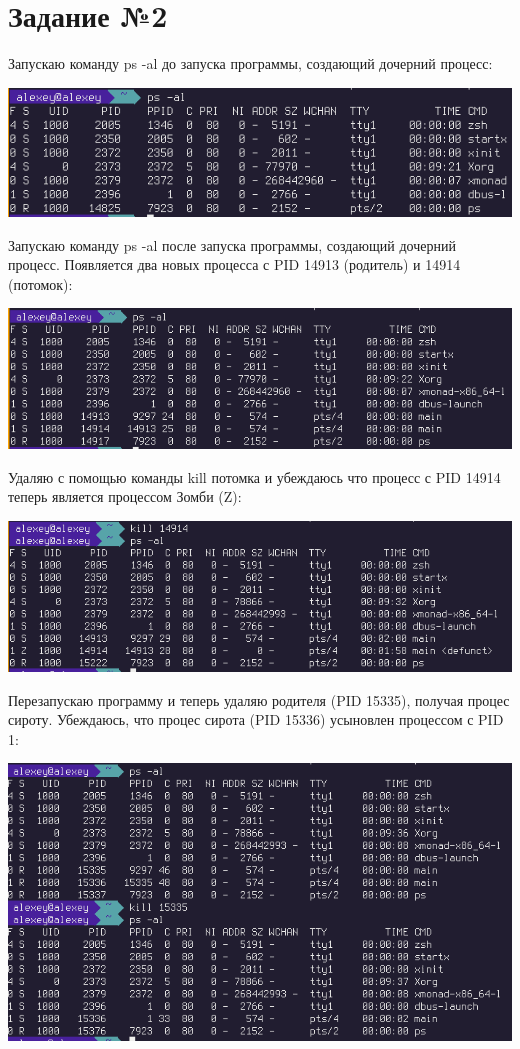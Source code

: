 \documentclass[12pt]{report}
\begin{document}
\chapter{Задание №2}

Запускаю команду ps -al до запуска программы, создающий дочерний процесс: 

\includegraphics[width=\linewidth]{img/task02_01.png}

Запускаю команду ps -al после запуска программы, создающий дочерний процесс. Появляется два новых процесса с PID 14913 (родитель) и 14914 (потомок):

\includegraphics[width=\linewidth]{img/task02_02.png}

Удаляю с помощью команды kill потомка и убеждаюсь что процесс с PID 14914 теперь является процессом Зомби (Z):

\includegraphics[width=\linewidth]{img/task02_04.png}

Перезапускаю программу и теперь удаляю родителя (PID 15335), получая процес сироту. Убеждаюсь, что процес сирота (PID 15336) усыновлен процессом с PID 1:

\includegraphics[width=\linewidth]{img/task02_05.png}
\end{document}
